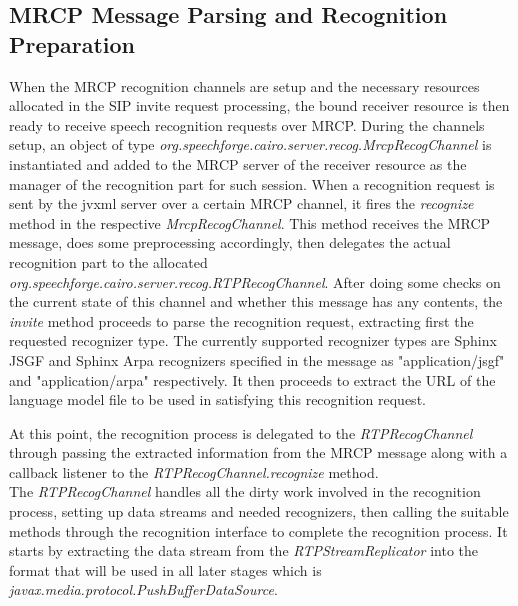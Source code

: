 \subsection{MRCP Message Parsing and Recognition Preparation}
\label{parsemrcp}
When the MRCP recognition channels are setup and the necessary resources allocated in the SIP invite request processing, the bound receiver resource is then ready to receive speech recognition requests over MRCP.
During the channels setup, an object of type \textit{org.speechforge.cairo.server.recog.MrcpRecogChannel} is instantiated and added to the MRCP server of the receiver resource as the manager of the recognition part for such session.
When a recognition request is sent by the \ac{jvxml} server over a certain MRCP channel, it fires the \textit{recognize} method in the respective \textit{MrcpRecogChannel}.
This method receives the MRCP message, does some preprocessing accordingly, then delegates the actual recognition part to the allocated \textit{org.speechforge.cairo.server.recog.RTPRecogChannel}.
After doing some checks on the current state of this channel and whether this message has any contents, the \textit{invite} method proceeds to parse the recognition request, extracting first the requested recognizer type.
The currently supported recognizer types are Sphinx JSGF and Sphinx Arpa recognizers specified in the message as "application/jsgf" and "application/arpa" respectively.
It then proceeds to extract the URL of the language model file to be used in satisfying this recognition request.

At this point, the recognition process is delegated to the \textit{RTPRecogChannel} through passing the extracted information from the MRCP message along with a callback listener to the \textit{RTPRecogChannel.recognize} method.\\
The \textit{RTPRecogChannel} handles all the dirty work involved in the recognition process, setting up data streams and needed recognizers, then calling the suitable methods through the recognition interface to complete the recognition process.
It starts by extracting the data stream from the \textit{RTPStreamReplicator} into the format that will be used in all later stages which is \textit{javax.media.protocol.PushBufferDataSource}.
